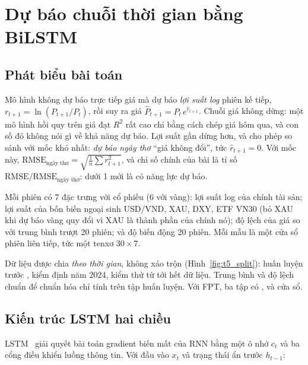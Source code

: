 \section{Dự báo chuỗi thời gian bằng BiLSTM}\label{sec:bilstm}
\subsection{Phát biểu bài toán}
Mô hình không dự báo trực tiếp giá mà dự báo \emph{lợi suất log} phiên kế tiếp, $r_{t+1} = \ln(P_{t+1}/P_t)$,
rồi suy ra giá $\hat P_{t+1} = P_t\, e^{\hat r_{t+1}}$. Chuỗi giá không dừng: một mô hình hồi quy trên giá đạt $R^2$
rất cao chỉ bằng cách chép giá hôm qua, và con số đó không nói gì về khả năng dự báo. Lợi suất gần dừng hơn, và cho
phép so sánh với mốc khó nhất: \emph{dự báo ngây thơ} ``giá không đổi'', tức $\hat r_{t+1} = 0$. Với mốc này,
$\mathrm{RMSE}_{\text{ngây thơ}} = \sqrt{\tfrac{1}{n}\sum r_{t+1}^2}$, và chỉ số chính của bài là tỉ số
$\mathrm{RMSE}/\mathrm{RMSE}_{\text{ngây thơ}}$: dưới 1 mới là có năng lực dự báo.

Mỗi phiên có 7 đặc trưng với cổ phiếu (6 với vàng): lợi suất log của chính tài sản; lợi suất của bốn biến ngoại sinh
USD/VND, XAU, DXY, ETF VN30 (bỏ XAU khi dự báo vàng quy đổi vì XAU là thành phần của chính nó); độ lệch của giá so
với trung bình trượt 20 phiên; và độ biến động 20 phiên. Mỗi mẫu là một cửa sổ
 phiên liên tiếp, tức một tenxơ $30 \times 7$.



Dữ liệu được chia \emph{theo thời gian}, không xáo trộn (Hình~\ref{fig:t5_split}): huấn luyện trước
, kiểm định năm 2024, kiểm thử từ  tới hết dữ liệu.
Trung bình và độ lệch chuẩn để chuẩn hóa chỉ tính trên tập huấn luyện. Với FPT, ba tập có ,
 và  cửa sổ.


\subsection{Kiến trúc LSTM hai chiều}
LSTM~\cite{hochreiter1997lstm} giải quyết bài toán gradient biến mất của RNN bằng một ô nhớ $c_t$ và ba cổng điều
khiển luồng thông tin. Với đầu vào $x_t$ và trạng thái ẩn trước $h_{t-1}$:

